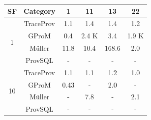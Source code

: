 \begin{tabular}{|c|c|c|c|c|c|}
\hline
SF & Category & 1 & 11 & 13 & 22 \\  
 \hline 
 \multirow{4}{*}{1} & TraceProv & 1.1 & 1.4 & 1.4 & 1.2 \\  
 \cline{2-6} 
  & GProM & 0.4 & 2.4 K & 3.4 & 1.9 K \\  
 \cline{2-6} 
  & Müller & 11.8 & 10.4 & 168.6 & 2.0 \\  
 \cline{2-6} 
  & ProvSQL & - & - & - & - \\  
 \hline 
 \multirow{4}{*}{10} & TraceProv & 1.1 & 1.1 & 1.2 & 1.0 \\  
 \cline{2-6} 
  & GProM & 0.43 & - & 2.0 & - \\  
 \cline{2-6} 
  & Müller & - & 7.8 & - & 2.1 \\  
 \cline{2-6} 
  & ProvSQL & - & - & - & - \\ 
\hline
\end{tabular}